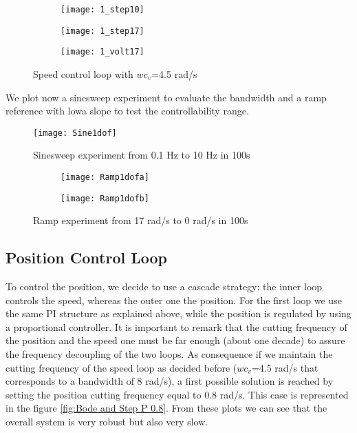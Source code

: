 \begin{figure*}[h]
	\centering
	\begin{subfigure}{0.33\columnwidth}
		\texttt{[image: 1\_step10]}
	\end{subfigure}
	\begin{subfigure}{0.33\columnwidth}
		\texttt{[image: 1\_step17]}
	\end{subfigure}
	\begin{subfigure}{0.32\columnwidth}
		\texttt{[image: 1\_volt17]}
	\end{subfigure}
	\caption{Speed control loop with  $wc_{v} $=4.5 rad/s}
	\label{fig:PI with 4.5}
\end{figure*}

\newpage We plot now a sinesweep experiment to evaluate the bandwidth and a ramp reference with lowa slope to test the controllability range.

\begin{figure*}[h]
	\centering
	\texttt{[image: Sine1dof]}
	\caption{Sinesweep experiment from 0.1 Hz to 10 Hz in 100s}
\end{figure*}

\begin{figure*}[h]
	\centering
	\begin{subfigure}{0.45\columnwidth}
		\texttt{[image: Ramp1dofa]}
	\end{subfigure}
	\begin{subfigure}{0.45\columnwidth}
		\texttt{[image: Ramp1dofb]}
	\end{subfigure}
	\caption{Ramp experiment from 17 rad/s to 0 rad/s in 100s}
	\label{fig:Ramp1dof}
\end{figure*}

\newpage
\subsection{Position Control Loop}
To control the position, we decide to use a cascade strategy: the inner loop controls the speed, whereas the outer one the position. For the first loop we use the same PI structure as explained above, while the position is regulated by using a proportional controller. It is important to remark that the cutting frequency of the position and the speed one must be far enough (about one decade) to assure the frequency decoupling of the two loops. As consequence if we maintain the cutting frequency of the speed loop as decided before ($wc_v$=4.5 rad/s that corresponds to a bandwidth of 8 rad/s), a first possible solution is reached by setting the position cutting frequency equal to 0.8 rad/s. This case is represented in the figure \ref{fig:Bode and Step P 0.8}. From these plots we can see that the overall system is very robust but also very slow.


